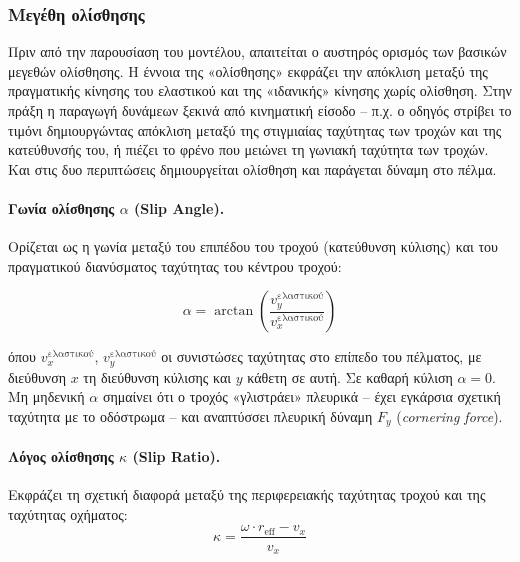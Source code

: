 
\label{subsec:combined_slip}

\subsubsection{Μεγέθη ολίσθησης}

Πριν από την παρουσίαση του μοντέλου, απαιτείται ο αυστηρός ορισμός των βασικών μεγεθών
ολίσθησης. Η έννοια της «ολίσθησης» εκφράζει την απόκλιση μεταξύ της πραγματικής κίνησης
του ελαστικού και της «ιδανικής» κίνησης χωρίς ολίσθηση. Στην πράξη η παραγωγή δυνάμεων
ξεκινά από κινηματική είσοδο -- π.χ. ο οδηγός στρίβει το τιμόνι δημιουργώντας απόκλιση
μεταξύ της στιγμιαίας ταχύτητας των τροχών και της κατεύθυνσής του, ή πιέζει το φρένο
που μειώνει τη γωνιακή ταχύτητα των τροχών. Και στις δυο περιπτώσεις δημιουργείται ολίσθηση
και παράγεται δύναμη στο πέλμα.

\paragraph{Γωνία ολίσθησης $\alpha$ (Slip Angle).}
Ορίζεται ως η γωνία μεταξύ του επιπέδου του τροχού (κατεύθυνση κύλισης) και του
πραγματικού διανύσματος ταχύτητας του κέντρου τροχού:

\begin{equation}
    \alpha = \arctan\!\left(\frac{v_{y}^{\text{ελαστικού}}}{v_{x}^{\text{ελαστικού}}}\right)
    \label{eq:slip_angle}
\end{equation}

όπου $v_{x}^{\text{ελαστικού}}$, $v_{y}^{\text{ελαστικού}}$ οι συνιστώσες ταχύτητας στο επίπεδο
του πέλματος, με διεύθυνση $x$ τη διεύθυνση κύλισης και $y$ κάθετη σε αυτή. Σε καθαρή κύλιση 
$\alpha = 0$. Μη μηδενική $\alpha$ σημαίνει ότι ο τροχός
«γλιστράει» πλευρικά -- έχει εγκάρσια σχετική ταχύτητα με το οδόστρωμα -- 
και αναπτύσσει πλευρική δύναμη $F_y$ (\textit{cornering force}).



\paragraph{Λόγος ολίσθησης $\kappa$ (Slip Ratio).}
Εκφράζει τη σχετική διαφορά μεταξύ της περιφερειακής ταχύτητας τροχού και της ταχύτητας
οχήματος:
\begin{equation}
    \kappa = \frac{\omega \cdot r_{\mathrm{eff}} - v_x}{v_x}
    \label{eq:slip_ratio}
\end{equation}

